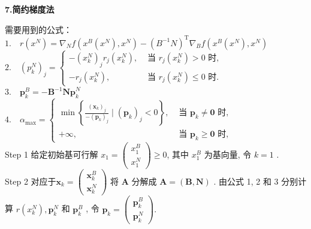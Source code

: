 \documentclass[cn]{elegantbook}
\begin{document}
\newpage
\begin{center}
 \textcolor[rgb]{0.33,0.33,1.00}{\huge \bf{7.简约梯度法}}
\end{center}

\begin{algorithm}
需要用到的公式：\\
$1.\quad r\left(x^{N}\right)=\nabla_{N} f\left(x^{B}\left(x^{N}\right), x^{N}\right)-\left(B^{-1} N\right)^{\mathrm{T}} \nabla_{B} f\left(x^{B}\left(x^{N}\right), x^{N}\right)$\\
$2.\quad \left(p_{k}^{N}\right)_{j}=\left\{\begin{array}{ll}
-\left(x_{k}^{N}\right)_{j} r_{j}\left(x_{k}^{N}\right), & \text { 当 } r_{j}\left(x_{k}^{N}\right)>0 \text { 时, } \\
-r_{j}\left(x_{k}^{N}\right), & \text { 当 } r_{j}\left(x_{k}^{N}\right) \leqslant 0 \text { 时. }
\end{array}\right.$\\
$3.\quad \boldsymbol{p}_{k}^{B}=-\boldsymbol{B}^{-1} \boldsymbol{N p}_{k}^{N}$\\
$4.\quad \alpha_{\max }=\left\{\begin{array}{ll}
\min \left\{\frac{\left(\boldsymbol{x}_{k}\right)_{j}}{-\left(\boldsymbol{p}_{k}\right)_{j}} \mid\left(\boldsymbol{p}_{k}\right)_{j}<0\right\}, & \text { 当 } \boldsymbol{p}_{k} \neq \boldsymbol{0} \text { 时, } \\
+\infty, & \text { 当 } \boldsymbol{p}_{k} \geqslant \mathbf{0} \text { 时, }
\end{array}\right.$\\
Step 1 给定初始基可行解 $ x_{1}=\left(\begin{array}{l}x_{1}^{B} \\ x_{1}^{N}\end{array}\right) \geqslant 0 $, 其中 $ x_{1}^{B}$  为基向量, 令 $ k   =1$ .\\
Step 2 对应于$  \boldsymbol{x}_{k}=\left(\begin{array}{l}\boldsymbol{x}_{k}^{B} \\ \boldsymbol{x}_{k}^{N}\end{array}\right) $ 将 $ \boldsymbol{A} $ 分解成  $\boldsymbol{A}=(\boldsymbol{B}, \boldsymbol{N})$ . 由公式 1, 2 和 3 分别计算  $r\left(x_{k}^{N}\right), \boldsymbol{p}_{k}^{N}$  和 $ \boldsymbol{p}_{k}^{B}$ , 令  $\boldsymbol{p}_{k}=\left(\begin{array}{c}\boldsymbol{p}_{k}^{B} \\ \boldsymbol{p}_{k}^{N}\end{array}\right) .$

\end{algorithm}
\end{document}
